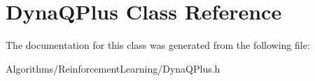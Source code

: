 \hypertarget{classDynaQPlus}{\section{Dyna\-Q\-Plus Class Reference}
\label{classDynaQPlus}
}


The documentation for this class was generated from the following file\-:\begin{DoxyCompactItemize}
\item 
Algorithms/\-Reinforcement\-Learning/Dyna\-Q\-Plus.\-h\end{DoxyCompactItemize}
